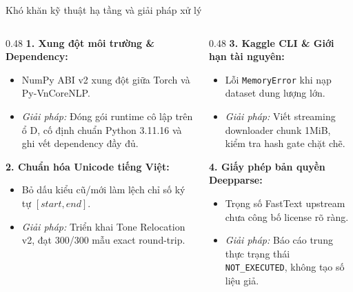\documentclass[aspectratio=169, 9pt]{beamer}
\begin{document}
\begin{frame}{Khó khăn kỹ thuật hạ tầng và giải pháp xử lý}
  \vspace{-0.15cm}
  \begin{columns}[T]
    \begin{column}{0.48\textwidth}
      \textbf{1. Xung đột môi trường \& Dependency:}
      \begin{itemize}
        \setlength{\itemsep}{1.5pt}
        \item NumPy ABI v2 xung đột giữa Torch và Py-VnCoreNLP.
        \item \textit{Giải pháp:} Đóng gói runtime cô lập trên ổ D, cố định chuẩn Python 3.11.16 và ghi vết dependency đầy đủ.
      \end{itemize}
      \vspace{0.1cm}
      \textbf{2. Chuẩn hóa Unicode tiếng Việt:}
      \begin{itemize}
        \setlength{\itemsep}{1.5pt}
        \item Bỏ dấu kiểu cũ/mới làm lệch chỉ số ký tự $[start, end]$.
        \item \textit{Giải pháp:} Triển khai Tone Relocation v2, đạt 300/300 mẫu exact round-trip.
      \end{itemize}
    \end{column}
    \begin{column}{0.48\textwidth}
      \textbf{3. Kaggle CLI \& Giới hạn tài nguyên:}
      \begin{itemize}
        \setlength{\itemsep}{1.5pt}
        \item Lỗi \texttt{MemoryError} khi nạp dataset dung lượng lớn.
        \item \textit{Giải pháp:} Viết streaming downloader chunk 1MiB, kiểm tra hash gate chặt chẽ.
      \end{itemize}
      \vspace{0.1cm}
      \textbf{4. Giấy phép bản quyền Deepparse:}
      \begin{itemize}
        \setlength{\itemsep}{1.5pt}
        \item Trọng số FastText upstream chưa công bố license rõ ràng.
        \item \textit{Giải pháp:} Báo cáo trung thực trạng thái \texttt{NOT\_EXECUTED}, không tạo số liệu giả.
      \end{itemize}
    \end{column}
  \end{columns}
\end{frame}
\end{document}
